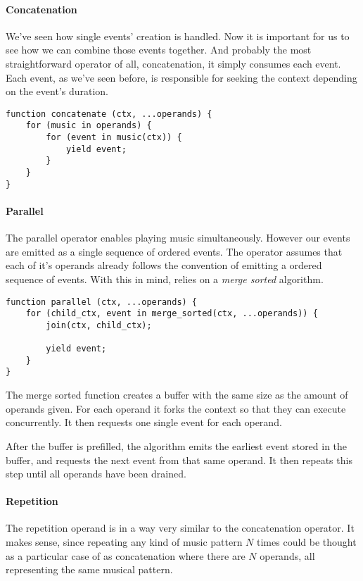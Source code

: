 \documentclass[a4paper,UKenglish,cleveref, autoref]{oasics-v2019}
\begin{document}
\paragraph*{Concatenation}
We've seen how single events' creation is handled. Now it is important for us to see how we can combine those events together. And probably the most straightforward operator of all, concatenation, it simply consumes each event. Each event, as we've seen before, is responsible for seeking the context depending on the event's duration.
\begin{lstlisting}[caption={Algorithm to concatenate musical events},label=list:8-6,captionpos=t,abovecaptionskip=-\medskipamount]
function concatenate (ctx, ...operands) {
    for (music in operands) {
        for (event in music(ctx)) {
            yield event;
        }
    }
}
\end{lstlisting}

\paragraph*{Parallel}
The parallel operator enables playing music simultaneously. However our events are emitted as a single sequence of ordered events. The operator assumes that each of it's operands already follows the convention of emitting a ordered sequence of events. With this in mind, relies on a \textit{merge sorted} algorithm.

\begin{lstlisting}[caption={Algorithm to merge parallel musical events},label=list:8-6,captionpos=t,abovecaptionskip=-\medskipamount]
function parallel (ctx, ...operands) {
    for (child_ctx, event in merge_sorted(ctx, ...operands)) {
        join(ctx, child_ctx);
        
        yield event;
    }
}
\end{lstlisting}

The merge sorted function creates a buffer with the same size as the amount of operands given. For each operand it forks the context so that they can execute concurrently. It then requests one single event for each operand.

After the buffer is prefilled, the algorithm emits the earliest event stored in the buffer, and requests the next event from that same operand. It then repeats this step until all operands have been drained.

\paragraph*{Repetition}
The repetition operand is in a way very similar to the concatenation operator. It makes sense, since repeating any kind of music pattern $N$ times could be thought as a particular case of as concatenation where there are $N$ operands, all representing the same musical pattern.
\end{document}
